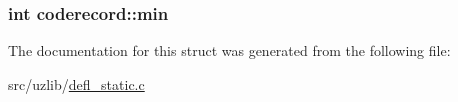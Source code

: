 \subsubsection[{\texorpdfstring{min}{min}}]{\setlength{\rightskip}{0pt plus 5cm}int coderecord\+::min}\hypertarget{structcoderecord_ac5c969af184cce64ed62e83e293863a9}{}\label{structcoderecord_ac5c969af184cce64ed62e83e293863a9}


The documentation for this struct was generated from the following file\+:\begin{DoxyCompactItemize}
\item 
src/uzlib/\hyperlink{defl__static_8c}{defl\+\_\+static.\+c}\end{DoxyCompactItemize}
